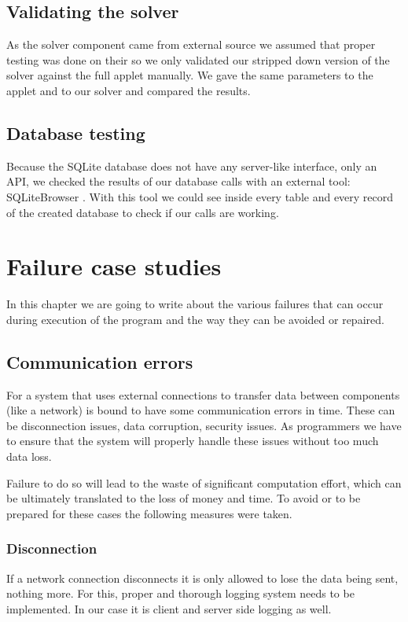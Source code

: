 \documentclass[10pt,a4paper]{report}
\begin{document}
\section{Validating the solver}
As the solver component came from external source we assumed that proper testing was done on their so we only validated our stripped down version of the solver against the full applet manually. We gave the same parameters to the applet and to our solver and compared the results.

\section{Database testing}
Because the SQLite database does not have any server-like interface, only an API, we checked the results of our database calls with an external tool: SQLiteBrowser \cite{WWW:SQLiteBr}. With this tool we could see inside every table and every record of the created database to check if our calls are working.

\chapter{Failure case studies}
\label{ch:fail}
In this chapter we are going to write about the various failures that can occur during execution of the program and the way they can be avoided or repaired.

\section{Communication errors}
For a system that uses external connections to transfer data between components (like a network) is bound to have some communication errors in time. These can be disconnection issues, data corruption, security issues. As programmers we have to ensure that the system will properly handle these issues without too much data loss.

Failure to do so will lead to the waste of significant computation effort, which can be ultimately translated to the loss of money and time. To avoid or to be prepared for these cases the following measures were taken.

\subsection{Disconnection}
If a network connection disconnects it is only allowed to lose the data being sent, nothing more. For this, proper and thorough logging system needs to be implemented. In our case it is client and server side logging as well.
\end{document}
